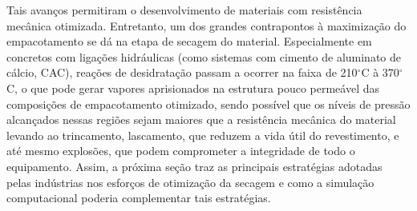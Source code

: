 Tais avanços permitiram o desenvolvimento de materiais com resistência mecânica
otimizada. Entretanto, um dos grandes contrapontos à maximização do
empacotamento se dá na etapa de secagem do material. Especialmente em concretos
com ligações hidráulicas (como sistemas com cimento de aluminato de cálcio,
CAC), reações de desidratação passam a ocorrer na faixa de 210$^\circ$C à
370$^\circ$C, o que pode gerar vapores aprisionados na estrutura pouco
permeável das composições de empacotamento otimizado, sendo possível que os
níveis de pressão alcançados nessas regiões sejam maiores que a resistência
mecânica do material levando ao trincamento, lascamento, que reduzem a vida útil
do revestimento, e até mesmo explosões, que podem comprometer a integridade de
todo o equipamento. Assim, a próxima seção traz as principais estratégias
adotadas pelas indústrias nos esforços de otimização da secagem e como a
simulação computacional poderia complementar tais estratégias.
 

